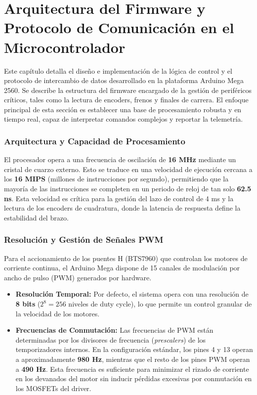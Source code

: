 \chapter{Arquitectura del Firmware y Protocolo de Comunicación en el Microcontrolador}
\lineaLateral

\begin{resumenCapitulo}
Este capítulo detalla el diseño e implementación de la lógica de control y el protocolo de intercambio de datos desarrollado en la plataforma Arduino Mega 2560. Se describe la estructura del firmware encargado de la gestión de periféricos críticos, tales como la lectura de encoders, frenos y finales de carrera. 
El enfoque principal de esta sección es establecer una base de procesamiento robusta y en tiempo real, capaz de interpretar comandos complejos y reportar la telemetría.
\end{resumenCapitulo}


\subsection{Arquitectura y Capacidad de Procesamiento}
El procesador opera a una frecuencia de oscilación de \textbf{16 MHz} mediante un cristal de cuarzo externo. Esto se traduce en una velocidad de ejecución cercana a los \textbf{16 MIPS} (millones de instrucciones por segundo), permitiendo que la mayoría de las instrucciones se completen en un periodo de reloj de tan solo \textbf{62.5 ns}. Esta velocidad es crítica para la gestión del lazo de control de 4 ms y la lectura de los encoders de cuadratura, donde la latencia de respuesta define la estabilidad del brazo.

\subsection{Resolución y Gestión de Señales PWM}
Para el accionamiento de los puentes H (BTS7960) que controlan los motores de corriente continua, el Arduino Mega dispone de 15 canales de modulación por ancho de pulso (PWM) generados por hardware.
\begin{itemize}
	\item \textbf{Resolución Temporal:} Por defecto, el sistema opera con una resolución de \textbf{8 bits} ($2^8 = 256$ niveles de duty cycle), lo que permite un control granular de la velocidad de los motores.
	\item \textbf{Frecuencias de Conmutación:} Las frecuencias de PWM están determinadas por los divisores de frecuencia (\textit{prescalers}) de los temporizadores internos. En la configuración estándar, los pines 4 y 13 operan a aproximadamente \textbf{980 Hz}, mientras que el resto de los pines PWM operan a \textbf{490 Hz}. Esta frecuencia es suficiente para minimizar el rizado de corriente en los devanados del motor sin inducir pérdidas excesivas por conmutación en los MOSFETs del driver.
\end{itemize}


